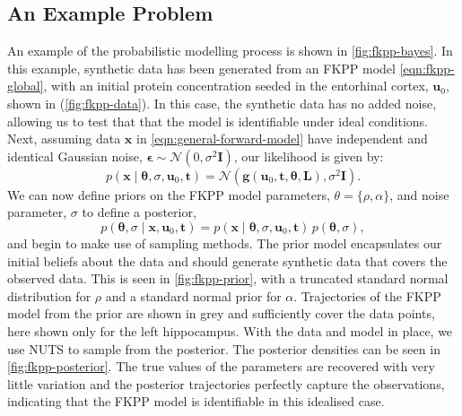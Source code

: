 \subsection{An Example Problem}
An example of the probabilistic modelling process is shown in
\cref{fig:fkpp-bayes}. In this example, synthetic data has been generated from
an FKPP model \cref{eqn:fkpp-global}, with an initial protein
concentration seeded in the entorhinal cortex, $\mathbf{u}_0$, shown in
(\cref{fig:fkpp-data}). In this case, the synthetic data has no added noise,
allowing us to test that that the model is identifiable under ideal conditions.
Next, assuming data $\mathbf{x}$ in \cref{eqn:general-forward-model} have
independent and identical Gaussian noise, $\boldsymbol{\epsilon} \sim
\mathcal{N}(0, \sigma^2\mathbf{I})$, our likelihood is given by: 
\[
    p(\mathbf{x} \mid \boldsymbol{\theta}, \sigma, \mathbf{u}_0, \mathbf{t}) = \mathcal{N}(\mathbf{g}(\mathbf{u}_0, \mathbf{t}, \boldsymbol{\theta}, \mathbf{L}), \sigma^2\mathbf{I}).
\]
We can now define priors on the FKPP model parameters, $\theta = \{\rho,
\alpha\}$, and noise parameter, $\sigma$ to define a posterior,
\[
    p(\boldsymbol{\theta}, \sigma \mid \mathbf{x}, \mathbf{u}_0, \mathbf{t}) = p(\mathbf{x} \mid \boldsymbol{\theta}, \sigma, \mathbf{u}_0, \mathbf{t})\,p(\boldsymbol{\theta}, \sigma),
\]
and begin to make use of sampling methods. The prior model encapsulates our
initial beliefs about the data and should generate synthetic data that covers
the observed data. This is seen in \cref{fig:fkpp-prior}, with a truncated
standard normal distribution for $\rho$ and a standard normal prior for
$\alpha$. Trajectories of the FKPP model from the prior are shown in grey and
sufficiently cover the data points, here shown only for the left hippocampus.
With the data and model in place, we use NUTS to sample from the posterior. The
posterior densities can be seen in \cref{fig:fkpp-posterior}. The true values of
the parameters are recovered with very little variation and the posterior
trajectories perfectly capture the observations, indicating that the FKPP model
is identifiable in this idealised case.

